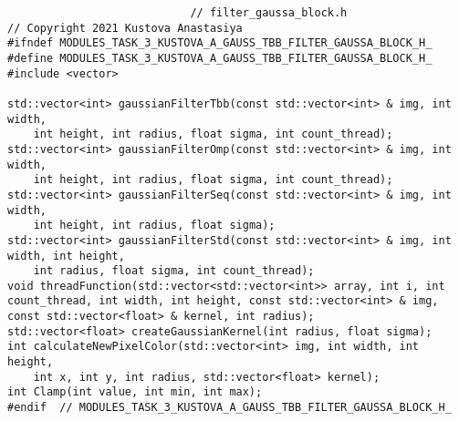 \documentclass{report}
\begin{document}
\begin{lstlisting}
							// filter_gaussa_block.h
// Copyright 2021 Kustova Anastasiya
#ifndef MODULES_TASK_3_KUSTOVA_A_GAUSS_TBB_FILTER_GAUSSA_BLOCK_H_
#define MODULES_TASK_3_KUSTOVA_A_GAUSS_TBB_FILTER_GAUSSA_BLOCK_H_
#include <vector>

std::vector<int> gaussianFilterTbb(const std::vector<int> & img, int width,
    int height, int radius, float sigma, int count_thread);
std::vector<int> gaussianFilterOmp(const std::vector<int> & img, int width,
    int height, int radius, float sigma, int count_thread);
std::vector<int> gaussianFilterSeq(const std::vector<int> & img, int width,
    int height, int radius, float sigma);
std::vector<int> gaussianFilterStd(const std::vector<int> & img, int width, int height,
    int radius, float sigma, int count_thread);
void threadFunction(std::vector<std::vector<int>> array, int i, int count_thread, int width, int height, const std::vector<int> & img, const std::vector<float> & kernel, int radius);
std::vector<float> createGaussianKernel(int radius, float sigma);
int calculateNewPixelColor(std::vector<int> img, int width, int height,
    int x, int y, int radius, std::vector<float> kernel);
int Clamp(int value, int min, int max);
#endif  // MODULES_TASK_3_KUSTOVA_A_GAUSS_TBB_FILTER_GAUSSA_BLOCK_H_

\end{lstlisting}
\end{document}
